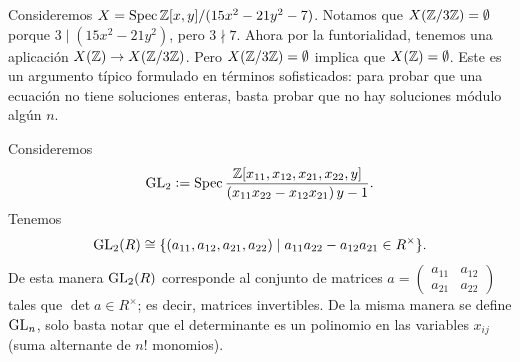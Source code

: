 \documentclass{article}
\numberwithin{equation}{section}
\theoremstyle{definition}
\begin{document}
\begin{ejemplo}
  Consideremos $X = \operatorname{Spec} \mathbb{Z} [x,y]/(15x^2 - 21y^2 - 7)$. Notamos que
  $X (\mathbb{Z}/3\mathbb{Z}) = \emptyset$ porque $3 \mid (15x^2 - 21y^2)$,
  pero $3 \nmid 7$. Ahora por la funtorialidad, tenemos una aplicación
  $X (\mathbb{Z}) \to X (\mathbb{Z}/3\mathbb{Z})$. Pero $X (\mathbb{Z}/3\mathbb{Z}) = \emptyset$ implica que
  $X (\mathbb{Z}) = \emptyset$. Este es un argumento típico formulado en términos
  sofisticados: para probar que una ecuación no tiene soluciones enteras,
  basta probar que no hay soluciones módulo algún $n$.
\end{ejemplo}

\begin{ejemplo}
  Consideremos
  $$\operatorname{GL}_2 \mathrel{\mathop:}= \operatorname{Spec} \frac{\mathbb{Z} [x_{11}, x_{12}, x_{21}, x_{22}, y]}{(x_{11} x_{22} - x_{12} x_{21})\,y - 1}.$$
  Tenemos
  $$\operatorname{GL}_2 (R) \cong \{ (a_{11}, a_{12}, a_{21}, a_{22}) \mid a_{11} a_{22} - a_{12} a_{21} \in R^\times \}.$$
  De esta manera $\operatorname{GL}_2 (R)$ corresponde al conjunto de matrices
  $a = \begin{pmatrix}
    a_{11} & a_{12} \\
    a_{21} & a_{22}
  \end{pmatrix}$ tales que $\det a \in R^\times$; es decir, matrices
  invertibles. De la misma manera se define $\operatorname{GL}_n$, solo basta notar que
  el determinante es un polinomio en las variables $x_{ij}$ (suma alternante
  de $n!$ monomios).
\end{ejemplo}
\end{document}
